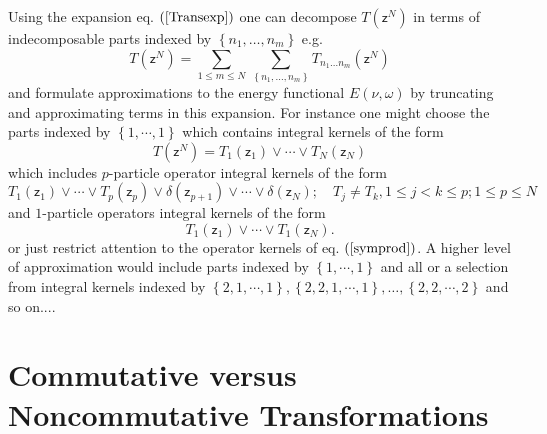 \documentclass[aps,preprint]{revtex4}%
\begin{document}
Using the expansion eq. $\left(  \ref{Transexp}\right)  $ one can decompose
$T\left(  \mathsf{z}^{N}\right)  $ in terms of indecomposable parts indexed by
$\left\{  n_{1},\ldots,n_{m}\right\}  $ e.g.
\begin{equation}
T\left(  \mathsf{z}^{N}\right)  =\sum_{1\leq m\leq N}\,%
{\textstyle\sum\limits_{\left\{  n_{1},\ldots,n_{m}\right\}  }}
T_{n_{1}\ldots n_{m}}\left(  \mathsf{z}^{N}\right)  \label{vwexpan}%
\end{equation}
and formulate approximations to the energy functional $E\left(  \nu
,\omega\right)  $ by truncating and approximating terms in this expansion. For
instance one might choose the parts indexed by $\left\{  1,\cdots,1\right\}  $
which contains integral kernels of the form
\begin{equation}
T\left(  \mathsf{z}^{N}\right)  =T_{1}\left(  \mathsf{z}_{1}\right)
\vee\cdots\vee T_{N}\left(  \mathsf{z}_{N}\right)
\end{equation}
which includes $p$-particle operator integral kernels of the form%
\begin{equation}
T_{1}\left(  \mathsf{z}_{1}\right)  \vee\cdots\vee T_{p}\left(  \mathsf{z}%
_{p}\right)  \vee\delta\left(  \mathsf{z}_{p+1}\right)  \vee\cdots\vee
\delta\left(  \mathsf{z}_{N}\right)  ;\quad T_{j}\neq T_{k},1\leq j<k\leq
p;1\leq p\leq N
\end{equation}
and $1$-particle operators integral kernels of the form
\begin{equation}
T_{1}\left(  \mathsf{z}_{1}\right)  \vee\cdots\vee T_{1}\left(  \mathsf{z}%
_{N}\right)  . \label{symprod}%
\end{equation}
or just restrict attention to the operator kernels of eq. $\left(
\ref{symprod}\right)  $. A higher level of approximation would include parts
indexed by $\left\{  1,\cdots,1\right\}  $ and all or a selection from
integral kernels indexed by $\left\{  2,1,\cdots,1\right\}  ,\left\{
2,2,1,\cdots,1\right\}  ,\ldots,\left\{  2,2,\cdots,2\right\}  $ and so on....

\section{Commutative versus Noncommutative Transformations \label{NVCT}}
\end{document}
